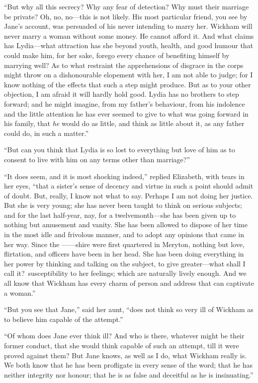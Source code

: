 \documentclass[12pt,english]{book}
\begin{document}
{}``But why all this secrecy? Why any fear of detection? Why must
their marriage be private? Oh, no, no\mbox{---}this is not likely.
His most particular friend, you see by Jane's account, was persuaded
of his never intending to marry her. Wickham will never marry a woman
without some money. He cannot afford it. And what claims has Lydia\mbox{---}what
attraction has she beyond youth, health, and good humour that could
make him, for her sake, forego every chance of benefiting himself
by marrying well? As to what restraint the apprehensions of disgrace
in the corps might throw on a dishonourable elopement with her, I
am not able to judge; for I know nothing of the effects that such
a step might produce. But as to your other objection, I am afraid
it will hardly hold good. Lydia has no brothers to step forward; and
he might imagine, from my father's behaviour, from his indolence and
the little attention he has ever seemed to give to what was going
forward in his family, that \textit{he} would do as little, and think
as little about it, as any father could do, in such a matter.''

{}``But can you think that Lydia is so lost to everything but love
of him as to consent to live with him on any terms other than marriage?''\ 

{}``It does seem, and it is most shocking indeed,'' replied Elizabeth,
with tears in her eyes, {}``that a sister's sense of decency and
virtue in such a point should admit of doubt. But, really, I know
not what to say. Perhaps I am not doing her justice. But she is very
young; she has never been taught to think on serious subjects; and
for the last half-year, nay, for a twelvemonth\mbox{---}she has been
given up to nothing but amusement and vanity. She has been allowed
to dispose of her time in the most idle and frivolous manner, and
to adopt any opinions that came in her way. Since the \mbox{------}shire
were first quartered in Meryton, nothing but love, flirtation, and
officers have been in her head. She has been doing everything in her
power by thinking and talking on the subject, to give greater\mbox{---}what
shall I call it?\ susceptibility to her feelings; which are naturally
lively enough. And we all know that Wickham has every charm of person
and address that can captivate a woman.''

{}``But you see that Jane,'' said her aunt, {}``does not think
so very ill of Wickham as to believe him capable of the attempt.''

{}``Of whom does Jane ever think ill? And who is there, whatever
might be their former conduct, that she would think capable of such
an attempt, till it were proved against them? But Jane knows, as well
as I do, what Wickham really is. We both know that he has been profligate
in every sense of the word; that he has neither integrity nor honour;
that he is as false and deceitful as he is insinuating.''
\end{document}
